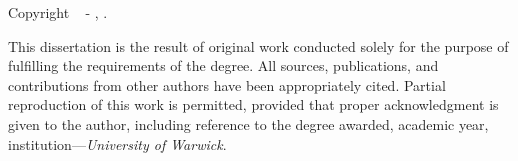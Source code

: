 
\vspace*{\fill}

{%
    \noindent \textbf{\GetTitle}
    
    \noindent Copyright \textcopyright~\the\year{} - \GetFirstAuthor, \GetSchool.
    
    \vspace{.575em}

    \noindent This dissertation is the result of original work conducted solely for the purpose of fulfilling the requirements of the degree. All sources, publications, and contributions from other authors have been appropriately cited. Partial reproduction of this work is permitted, provided that proper acknowledgment is given to the author, including reference to the degree awarded, academic year, institution---\textit{University of Warwick}.

    \vspace{2.4em}
    
    \noindent{}
    

}

\vspace*{\fill}

